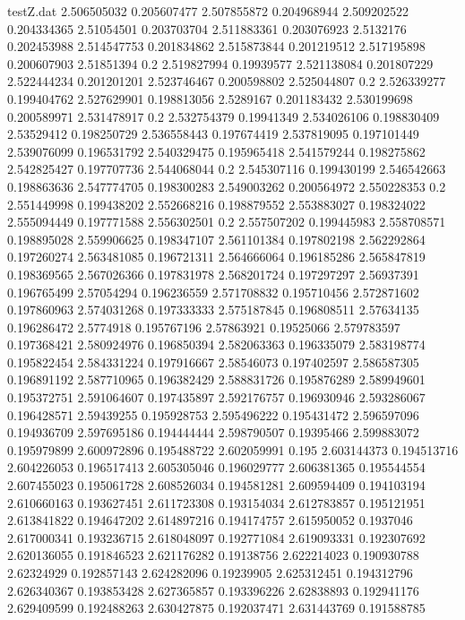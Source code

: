 \begin{filecontents*}{testZ.dat}
2.506505032  0.205607477
2.507855872  0.204968944
2.509202522  0.204334365
2.51054501  0.203703704
2.511883361  0.203076923
2.5132176  0.202453988
2.514547753  0.201834862
2.515873844  0.201219512
2.517195898  0.200607903
2.51851394  0.2
2.519827994  0.19939577
2.521138084  0.201807229
2.522444234  0.201201201
2.523746467  0.200598802
2.525044807  0.2
2.526339277  0.199404762
2.527629901  0.198813056
2.5289167  0.201183432
2.530199698  0.200589971
2.531478917  0.2
2.532754379  0.19941349
2.534026106  0.198830409
2.53529412  0.198250729
2.536558443  0.197674419
2.537819095  0.197101449
2.539076099  0.196531792
2.540329475  0.195965418
2.541579244  0.198275862
2.542825427  0.197707736
2.544068044  0.2
2.545307116  0.199430199
2.546542663  0.198863636
2.547774705  0.198300283
2.549003262  0.200564972
2.550228353  0.2
2.551449998  0.199438202
2.552668216  0.198879552
2.553883027  0.198324022
2.555094449  0.197771588
2.556302501  0.2
2.557507202  0.199445983
2.558708571  0.198895028
2.559906625  0.198347107
2.561101384  0.197802198
2.562292864  0.197260274
2.563481085  0.196721311
2.564666064  0.196185286
2.565847819  0.198369565
2.567026366  0.197831978
2.568201724  0.197297297
2.56937391  0.196765499
2.57054294  0.196236559
2.571708832  0.195710456
2.572871602  0.197860963
2.574031268  0.197333333
2.575187845  0.196808511
2.57634135  0.196286472
2.5774918  0.195767196
2.57863921  0.19525066
2.579783597  0.197368421
2.580924976  0.196850394
2.582063363  0.196335079
2.583198774  0.195822454
2.584331224  0.197916667
2.58546073  0.197402597
2.586587305  0.196891192
2.587710965  0.196382429
2.588831726  0.195876289
2.589949601  0.195372751
2.591064607  0.197435897
2.592176757  0.196930946
2.593286067  0.196428571
2.59439255  0.195928753
2.595496222  0.195431472
2.596597096  0.194936709
2.597695186  0.194444444
2.598790507  0.19395466
2.599883072  0.195979899
2.600972896  0.195488722
2.602059991  0.195
2.603144373  0.194513716
2.604226053  0.196517413
2.605305046  0.196029777
2.606381365  0.195544554
2.607455023  0.195061728
2.608526034  0.194581281
2.609594409  0.194103194
2.610660163  0.193627451
2.611723308  0.193154034
2.612783857  0.195121951
2.613841822  0.194647202
2.614897216  0.194174757
2.615950052  0.1937046
2.617000341  0.193236715
2.618048097  0.192771084
2.619093331  0.192307692
2.620136055  0.191846523
2.621176282  0.19138756
2.622214023  0.190930788
2.62324929  0.192857143
2.624282096  0.19239905
2.625312451  0.194312796
2.626340367  0.193853428
2.627365857  0.193396226
2.62838893  0.192941176
2.629409599  0.192488263
2.630427875  0.192037471
2.631443769  0.191588785

\end{filecontents*}
